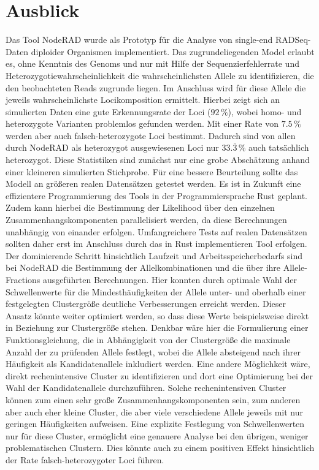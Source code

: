 \chapter{Ausblick} \label{sec:ausblick}

Das Tool NodeRAD \cite{noderad} wurde als Prototyp für die Analyse von single-end RADSeq-Daten diploider Organismen implementiert. Das zugrundeliegenden Model erlaubt es, ohne Kenntnis des Genoms und nur mit Hilfe der Sequenzierfehlerrate und Heterozygotiewahrscheinlichkeit die wahrscheinlichsten Allele zu identifizieren, die den beobachteten Reads zugrunde liegen. Im Anschluss wird für diese Allele die jeweils wahrscheinlichste Locikomposition ermittelt. Hierbei zeigt sich an simulierten Daten eine gute Erkennungsrate der Loci ($ 92\, \% $), wobei homo- und heterozygote Varianten problemlos gefunden werden. Mit einer Rate von $ 7.5\, \% $ werden aber auch falsch-heterozygote Loci bestimmt. Dadurch sind von allen durch NodeRAD als heterozygot ausgewiesenen Loci nur $ 33.\overline{3}\, \% $ auch tatsächlich heterozygot. Diese Statistiken sind zunächst nur eine grobe Abschätzung anhand einer kleineren simulierten Stichprobe. Für eine bessere Beurteilung sollte das Modell an größeren realen Datensätzen getestet werden. Es ist in Zukunft eine effizientere Programmierung des Tools in der Programmiersprache Rust geplant. Zudem kann hierbei die Bestimmung der Likelihood über den einzelnen Zusammenhangskomponenten parallelisiert werden, da diese Berechnungen unabhängig von einander erfolgen. Umfangreichere Tests auf realen Datensätzen sollten daher erst im Anschluss durch das in Rust implementieren Tool erfolgen. \\

Der dominierende Schritt hinsichtlich Laufzeit und Arbeitsspeicherbedarfs sind bei NodeRAD die Bestimmung der Allelkombinationen und die über ihre Allele-Fractions ausgeführten Berechnungen. Hier konnten durch optimale Wahl der Schwellenwerte für die Mindesthäufigkeiten der Allele unter- und oberhalb einer festgelegten Clustergröße deutliche Verbesserungen erreicht werden. Dieser Ansatz könnte weiter optimiert werden, so dass diese Werte beispielsweise direkt in Beziehung zur Clustergröße stehen. Denkbar wäre hier die Formulierung einer Funktionsgleichung, die in Abhängigkeit von der Clustergröße die maximale Anzahl der zu prüfenden Allele festlegt, wobei die Allele absteigend nach ihrer Häufigkeit als Kandidatenallele inkludiert werden. Eine andere Möglichkeit wäre, direkt rechenintensive Cluster zu identifizieren und dort eine Optimierung bei der Wahl der Kandidatenallele durchzuführen. Solche rechenintensiven Cluster können zum einen sehr große Zusammenhangskomponenten sein, zum anderen aber auch eher kleine Cluster, die aber viele verschiedene Allele jeweils mit nur geringen Häufigkeiten aufweisen. Eine explizite Festlegung von Schwellenwerten nur für diese Cluster, ermöglicht eine genauere Analyse bei den übrigen, weniger problematischen Clustern. Dies könnte auch zu einem positiven Effekt hinsichtlich der Rate falsch-heterozygoter Loci führen. \\

